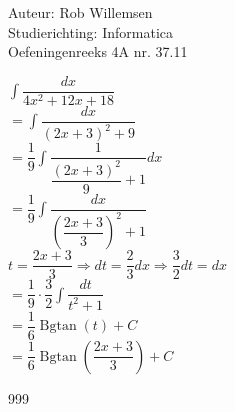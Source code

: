 \documentclass[a4paper]{article}
\newcommand{\dint}{\displaystyle\int}
\newcommand{\Bgtan}{\operatorname{Bgtan}}
\begin{document}
\noindent \large Auteur: Rob Willemsen \\
\noindent \large Studierichting: Informatica \\
\noindent \large Oefeningenreeks 4A nr. 37.11 \\

\medskip

\normalsize

$\dint \dfrac{dx}{4x^2+12x+18}$ \\

$= \dint \dfrac{dx}{(2x+3)^2+9}$ \\

$= \dfrac{1}{9} \dint \dfrac{1}{\dfrac{(2x+3)^2}{9}+1}dx$ \\

$= \dfrac{1}{9} \dint \dfrac{dx}{\left(\dfrac{2x+3}{3}\right)^2+1}$ \\

$t = \dfrac{2x+3}{3} \Rightarrow dt = \dfrac{2}{3} dx \Rightarrow \dfrac{3}{2} dt = dx$ \\

$= \dfrac{1}{9} \cdot \dfrac{3}{2} \dint \dfrac{dt}{t^2+1}$ \\

$= \dfrac{1}{6} \Bgtan(t) + C$ \\

$= \dfrac{1}{6} \Bgtan\left(\dfrac{2x+3}{3}\right) + C$ \\

\begin{thebibliography}{999}
\end{thebibliography}
\end{document}
